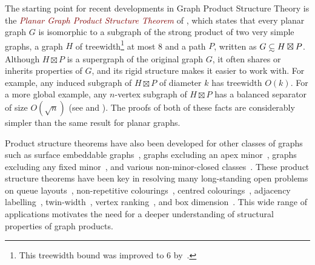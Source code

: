 \documentclass{patmorin}
\newcommand{\defn}[1]{\textcolor{Maroon}{\emph{#1}}}
\theoremstyle{plain}
\theoremstyle{definition}
\let\oldsubset\subset
\newcommand{\subsetsim}{\mathrel{\ooalign{\raise0.175ex\hbox{$\oldsubset$}\cr\hidewidth\raise-0.9ex\hbox{\scalebox{0.9}{$\sim$}}\hidewidth\cr}}}
\begin{document}

The starting point for recent developments in Graph Product Structure Theory is the \defn{Planar Graph Product Structure Theorem} of \citet{DJMMUW20}, which states that every planar graph $G$ is isomorphic to a subgraph of the strong
product of two very simple graphs, a graph $H$ of treewidth\footnote{This treewidth bound was improved to 6 by~\citet{UWY22}.} at most 8 and a path $P$, written as $G\subsetsim H\boxtimes P$.  Although $H\boxtimes P$ is a supergraph of the original graph $G$, it often shares or inherits properties of $G$, and its rigid structure makes it easier to work with. For example, any induced subgraph of $H\boxtimes P$  of diameter $k$ has treewidth $O(k)$. For a more global example, any $n$-vertex subgraph of $H\boxtimes P$ has a balanced separator of size $O(\sqrt{n})$ (see \cite[Lemma~6]{DJMMUW20} and \cite[Lemma~10]{DMW17}).  The proofs of both of these facts are considerably simpler than the same result for planar graphs. 

Product structure theorems have also been developed for other classes of graphs such as surface embeddable graphs~\citep{DJMMUW20,DHHW22}, graphs excluding an apex minor~\citep{DJMMUW20,ISW,DHHJLMMRW}, graphs excluding any fixed minor~\citep{DJMMUW20,DEMWW22}, and various non-minor-closed classes~\citep{DMW23,HW21b,DHSW,BDHK22}. These product structure theorems have been key in resolving many long-standing open problems on queue layouts~\citep{DJMMUW20}, non-repetitive colourings~\citep{DEJWW20}, centred colourings~\citep{DFMS21,DHHJLMMRW}, adjacency labelling~\cite{EJM23,DEJGMM21}, twin-width~\cite{BKW,KPS23-2,JP22}, vertex ranking~\citep{BDJM}, and box dimension~\citep{DGLTU22}. This wide range of applications motivates the need for a deeper understanding of structural properties of graph products. 
\end{document}
